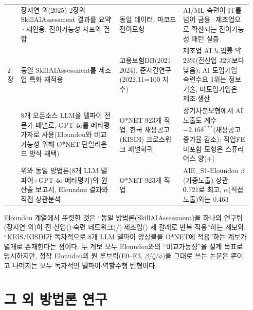 \documentclass[11pt]{article}
\begin{document}
\begin{longtable}{L{2.6cm}L{4.6cm}L{3.9cm}L{4.1cm}}
\citet{chang-2026-skill-network-ai-era} &
장지연 외(2025) 2장의 SkillAIAssessment 결과를 요약·재인용, 전이가능성 지표와 결합 &
동일 데이터, 마코프 전이모형 &
AI/ML 숙련이 IT를 넘어 금융·제조업으로 확산되는 전이가능성 패턴 실증\\

\citet{noh-2025-ai-based-manufacturing-innovation-employment} 2장 &
동일 SkillAIAssessment를 제조업 특화 재적용 &
고용보험DB(2021--2024), 준사건연구(2022.11=100 지수) &
제조업 AI 도입률 약 23\%(전산업 32\%보다 낮음); AI 도입기업 숙련수요 1위는 정보기술, 미도입기업은 제조$\cdot$생산\\

\citet{keis-2025-ai-job-exposure-labor-demand} &
8개 오픈소스 LLM을 델파이 전문가 패널로, GPT-4o를 메타평가자로 사용(Eloundou와 비교가능성 위해 O*NET$\cdot$단일라운드 방식 채택) &
O*NET 923개 직업, 한국 채용공고(KISDI) 크로스워크 패널회귀 &
장기차분모형에서 AI노출도 계수 $-2.168^{***}$(채용공고 증가율 감소); 직업FE 미포함 모형은 스퓨리어스 양(+)\\

\citet{son-2025-llm-based-ai-job-exposure-measurement} &
위와 동일 방법론(8개 LLM 델파이+GPT-4o 메타평가)의 원 산출 보고서, Eloundou 결과와 직접 상관분석 &
O*NET 923개 직업 &
AIE\_S1-Eloundou $\beta$(가중노출) 상관 0.721로 최고, $\alpha$(직접노출)와는 0.463\\

\end{longtable}

Eloundou 계열에서 뚜렷한 것은 ``동일 방법론(SkillAIAssessment)을 하나의 연구팀(장지연 외)이 전 산업(\citet{chang-2026-ai-technology-diffusion-employment})$\cdot$숙련 네트워크(\citet{chang-2025-ai-era-skills}/\citet{chang-2026-skill-network-ai-era})$\cdot$제조업(\citet{noh-2025-ai-based-manufacturing-innovation-employment}) 세 갈래로 반복 적용''하는 계보와, ``KEIS/KISDI가 독자적으로 8개 LLM 델파이 앙상블을 O*NET에 적용''하는 계보가 별개로 존재한다는 점이다. 두 계보 모두 Eloundou와의 ``비교가능성''을 설계 목표로 명시하지만, 정작 Eloundou의 원 루브릭(E0--E3, $\beta$/$\zeta$/$\phi$)을 그대로 쓰는 논문은 \citet{cheon-2025-ai-exposure-vs-ai-adoption}뿐이고 나머지는 모두 독자적인 델파이$\cdot$역할수행 변형이다.

\section{그 외 방법론 연구}
\end{document}
